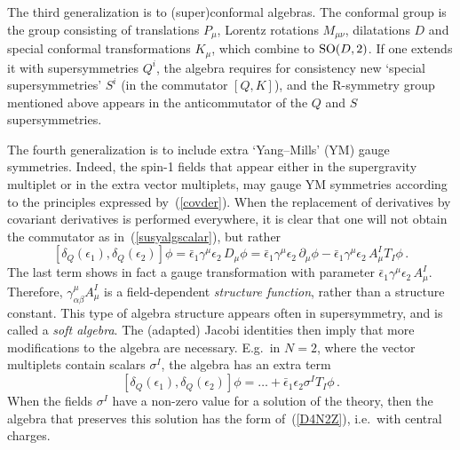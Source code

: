 \documentclass[a4paper,11pt,twoside]{article}
\newcommand{\Red}[1]{#1}
\newcommand{\OliveGreen}[1]{#1}
\newcommand{\Blue}[1]{#1}
\newcommand{\SO}{\mathop{\rm SO}}
\begin{document}
The third generalization is to (super)conformal algebras. The conformal
group is the group consisting of translations $\Blue{P_\mu}$, Lorentz
rotations $\Blue{M_{\mu \nu }}$, dilatations $\Blue{D}$ and special
conformal transformations $\Blue{K_\mu}$, which combine to $\SO(D,2)$. If
one extends it with supersymmetries $\Red{Q^i}$, the algebra requires for
consistency new `special supersymmetries' $\Red{S^i}$ (in the commutator
$[Q,K]$), and the R-symmetry group mentioned above appears in the
anticommutator of the $\Red{Q}$ and $\Red{S}$ supersymmetries.

The fourth generalization is to include extra `Yang--Mills' (YM) gauge
symmetries. Indeed, the spin-1 fields that appear either in the
supergravity multiplet or in the extra vector multiplets, may gauge YM
symmetries according to the principles expressed by~(\ref{covder}). When
the replacement of derivatives by covariant derivatives is performed
everywhere, it is clear that one will not obtain the commutator as
in~(\ref{susyalgscalar}), but rather
\begin{equation}
  \left[ \delta_Q (\OliveGreen{\epsilon _1}),\delta_Q (\OliveGreen{\epsilon _2})\right] \Blue{\phi}
  =\OliveGreen{\bar \epsilon _1}\gamma
^\mu \OliveGreen{\epsilon _2}\,D_\mu \Blue{\phi}%
 =\OliveGreen{\bar \epsilon _1}\gamma
^\mu \OliveGreen{\epsilon _2}\,\partial _\mu \Blue{\phi}-\OliveGreen{\bar
\epsilon _1}\gamma ^\mu \OliveGreen{\epsilon _2}\, \Blue{A_\mu ^I} T_I
\Blue{\phi}\,.
 \label{SUSYalgGauge}
\end{equation}
The last term shows in fact a gauge transformation with parameter
$\OliveGreen{\bar \epsilon _1}\gamma ^\mu \OliveGreen{\epsilon _2}\,
\Blue{A_\mu ^I}$. Therefore, $\gamma ^\mu_{\alpha \beta } \Blue{A_\mu
^I}$ is a field-dependent \emph{structure function}, rather than a
structure constant. This type of algebra structure appears often in
supersymmetry, and is called a \emph{soft algebra}. The (adapted) Jacobi
identities then imply that more modifications to the algebra are
necessary. E.g.\ in $N=2$, where the vector multiplets contain scalars
$\sigma ^I$, the algebra has an extra term
\begin{equation}
  \left[ \delta_Q (\OliveGreen{\epsilon _1}),\delta_Q (\OliveGreen{\epsilon _2})\right] \Blue{\phi} =\ldots +
\OliveGreen{\bar \epsilon _1}\OliveGreen{\epsilon _2}\Blue{\sigma ^I}
T_I\Blue{\phi}\,.
 \label{QQextraT}
\end{equation}
When the fields $\sigma ^I$ have a non-zero value for a solution of the
theory, then the algebra that preserves this solution has the form
of~(\ref{D4N2Z}), i.e.\ with central charges.
\end{document}
